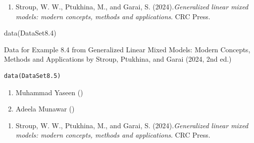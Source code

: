 \documentclass[a4paper]{book}
\begin{document}
%
\begin{References}
\begin{enumerate}

\item{} Stroup, W. W., Ptukhina, M., and Garai, S. (2024).\emph{Generalized linear mixed models: modern concepts, methods and applications}.
CRC Press.

\end{enumerate}

\end{References}
%
\begin{Examples}
\begin{ExampleCode}
data(DataSet8.4)
\end{ExampleCode}
\end{Examples}
%
\begin{Description}
Data for Example 8.4 from Generalized Linear Mixed Models: Modern Concepts, Methods and Applications by Stroup, Ptukhina, and Garai (2024, 2nd ed.)
\end{Description}
%
\begin{Usage}
\begin{verbatim}
data(DataSet8.5)
\end{verbatim}
\end{Usage}
%
\begin{Author}
\begin{enumerate}

\item{}  Muhammad Yaseen ()
\item{} Adeela Munawar ()

\end{enumerate}

\end{Author}
%
\begin{References}
\begin{enumerate}

\item{} Stroup, W. W., Ptukhina, M., and Garai, S. (2024).\emph{Generalized linear mixed models: modern concepts, methods and applications}.
CRC Press.

\end{enumerate}

\end{References}
%
\end{document}
